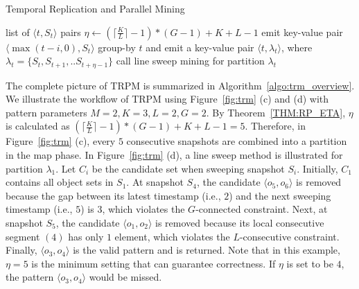 \begin{algorithm}[h]
\caption{Temporal Replication and Parallel Mining}
\label{algo:trm_overview}
\begin{algorithmic}[1]
\Require list of $\langle t, S_t \rangle$ pairs
\State $\eta \gets (\lceil \frac{K}{L} \rceil -1)*(G-1)+K+L-1$
\label{code:trm-map-start}
		\State emit key-value pair $\langle \max(t-i,0), S_t \rangle$ 
	\EndFor  
\EndFor
\label{code:trm-map-end}
\label{code:trm-par-start}
\State group-by $t$ and emit a key-value pair $\langle t, \lambda_t\rangle$, where $\lambda_t = \{S_t, S_{t+1}, .. S_{t+\eta-1}\} $
\EndFor
\label{code:trm-par-end}
\label{code:trm-red-start}
\State call line sweep mining for partition $\lambda_t$
\label{code:trm-red-end}
\EndFor
\end{algorithmic}
\end{algorithm}
\vspace{-0.5em}
The complete picture of TRPM is summarized in Algorithm~\ref{algo:trm_overview}. We illustrate the  workflow of TRPM using Figure~\ref{fig:trm} (c) and (d) with pattern
parameters $M=2, K=3, L = 2, G=2$. By Theorem~\ref{THM:RP_ETA}, $\eta$ is calculated
as $(\lceil \frac{K}{L} \rceil-1) *(G-1)+ K + L - 1 = 5$. Therefore, 
in Figure~\ref{fig:trm} (c), every $5$ consecutive snapshots are combined 
into a partition in the map phase. In Figure~\ref{fig:trm} (d), a line sweep
method is illustrated for partition $\lambda_1$. Let $C_i$ be the candidate set when sweeping snapshot $S_i$.
Initially, $C_1$ contains 
all object sets in 
$S_1$.
At snapshot $S_4$, the candidate
$\langle o_5,o_6 \rangle$ is removed because the gap between its latest timestamp (i.e., $2$)
and the next sweeping timestamp (i.e., $5$) is $3$, which violates the $G$-connected constraint.
Next, at snapshot $S_5$, the candidate $\langle o_1,o_2 \rangle$ is removed
because its local consecutive segment $(4)$ has only $1$ element,
which violates the $L$-consecutive constraint.
Finally, $\langle o_3,o_4 \rangle$ is the valid pattern and is returned. Note that in this example, $\eta=5$ is the minimum setting that can guarantee correctness. If $\eta$ is set to be $4$, the pattern $\langle o_3,o_4 \rangle$ would be missed. 




